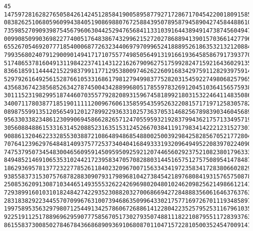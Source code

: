 \documentclass{article}
\begin{document}
\begin{verbatim}
45 14759728162827650584261424512858419005895877927172867170454220018091585985218474762085902733
08382625106805960994384051908698807672588439507895879458904274584488610673759294967291035323690
73598527090939875456796063044252947656841133103916443894914738745604947766408251854117733611553
00990850990369822774005176483867432996215272027868894139015703661427796383218596643499838024600
65526705469207771854000687726323440697970996524188895261863532132120884545889746663176353481069
79935680240791290090149417171075577498505649131916619364585867917393770995309306658514681232963
51748653781604913119842237411431221626790962751759928247159216436029135498781816145088780705956
83661859114444215229837991177129538009746262260916834297591128293975914611286552584204008881795
52979261649256152876610533168617981279499837752820315459227498068257965714456527406636705455609
43568367423856852634278745004342889968051785597832691204510364156575938067476085840495286933849
30111523198299518744607035577928208931596745818992180315322464114835086686825778874408140223240
34007117803877185190111112009676061358595435952632208157171971258305782688073583718330983714480
08987559913512056549120127899229363310257363705314682567898390346045689433922715130292374612103
95633033823486123099069458662826571247055959321928379943621757133495719495907466935865828139126
30560884886153316314520885231635153124526670384119179834142221231527301953778223587174112809062
90886132046223328553038872108648948685488002500392984258285670521772804200662659718966456688876
70764123962976484814093757725373404041684933319320964949522083970224090768751236641040408715962
74753795073454830046560959145095950925921207446560292375210823801796333887596239321887468006769
84948521469106535310244217239583470570828803144516575127575089541478487922869779458209619336688
18629369578137723227785261184023209670071563343419723583417283806602829883053991329830656251407
93855837315307576878288309079317989681042738454218976808419315765750878075196124684271652148779
25085362091308710344651493555326224269698020480102462098256214986612141204479950556249394957442
72938991601031018248427422935230882032700686694272848883560616463763763338471815730071625280265
28318382922344557070996763100739468635099643302175771697267011193485897209037417355725903667537
19975895356329798071254491342578606726886141228042235257952531167961035578401495446221035361455
92251911251788969629590777585670517302793507488111822108795511728393763085664079338676615829331
86155837300850278467843668689093691068087011047157228105003524547009141180293829599233582014457

\end{verbatim}
\end{document}
